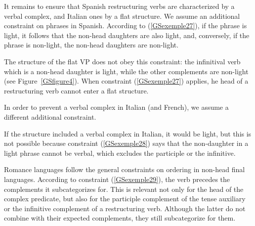 \documentclass[output=paper
                ,modfonts
                ,nonflat
	        ,collection
	        ,collectionchapter
	        ,collectiontoclongg
 	        ,biblatex
                ,babelshorthands
                ,newtxmath
                ,draftmode
                ,colorlinks, citecolor=brown
]{./langsci/langscibook}
\begin{document}
{It remains to ensure that Spanish restructuring verbs are characterized by a verbal complex, and Italian ones by a flat structure. We assume an additional constraint on phrases in Spanish. According to (\ref{GSexemple27}), if the phrase is light, it follows that the non-head daughters are also light, and, conversely, if the phrase is non-light, the non-head daughters are non-light.

\begin{exe}
\end{exe}
The structure of the flat VP does not obey this constraint: the infinitival verb which is a non-head daughter is light, while the other complements are non-light (see Figure~\ref{GSfigure4}). When constraint (\ref{GSexemple27}) applies, he head of a restructuring verb cannot enter a flat structure. 

In order to prevent a verbal complex in Italian (and French), we assume a different additional constraint.

\begin{exe}
\end{exe}

If the structure included a verbal complex in Italian, it would be light, but this is not possible because constraint (\ref{GSexemple28}) says that the non-daughter in a light phrase cannot be verbal, which excludes the participle or the infinitive.

Romance languages follow the general constraints on ordering in non-head final languages. According to constraint (\ref{GSexemple29}), the verb precedes the complements it subcategorizes for. This is relevant not only for the head of the complex predicate, but also for the participle complement of the tense auxiliary or the infinitive complement of a restructuring verb. Although the latter do not combine with their expected complements, they still subcategorize for them.  

}
\end{document}
